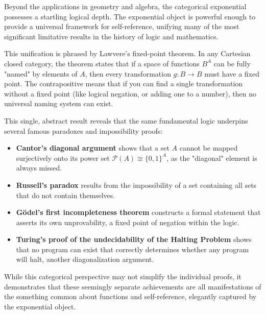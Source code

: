 \begin{tcolorbox}[
  colback=gray!5,
  colframe=gray!50,
  boxrule=0.5pt,
  arc=2pt,
  left=10pt,
  right=10pt,
  top=10pt,
  bottom=10pt,
  title={\centering\large\textbf{Lawvere's Fixed-Point Theorem and the Limits of Self-Reference}}
]

Beyond the applications in geometry and algebra, the categorical exponential possesses a startling logical depth. The exponential object is powerful enough to provide a universal framework for self-reference, unifying many of the most significant limitative results in the history of logic and mathematics.

This unification is phrased by Lawvere's fixed-point theorem. In any Cartesian closed category, the theorem states that if a space of functions $B^A$ can be fully "named" by elements of $A$, then every transformation $g: B \to B$ must have a fixed point. The contrapositive means that if you can find a single transformation without a fixed point (like logical negation, or adding one to a number), then no universal naming system can exist.

This single, abstract result reveals that the same fundamental logic underpins several famous paradoxes and impossibility proofs:

\begin{itemize}[leftmargin=*,itemsep=3pt]
\item \textbf{Cantor's diagonal argument} shows that a set $A$ cannot be mapped surjectively onto its power set $\mathcal{P}(A) \cong \{0, 1\}^A$, as the "diagonal" element is always missed.

\item \textbf{Russell's paradox} results from the impossibility of a set containing all sets that do not contain themselves.

\item \textbf{Gödel's first incompleteness theorem} constructs a formal statement that asserts its own unprovability, a fixed point of negation within the logic.

\item \textbf{Turing's proof of the undecidability of the Halting Problem} shows that no program can exist that correctly determines whether any program will halt, another diagonalization argument.
\end{itemize}

While this categorical perspective may not simplify the individual proofs, it demonstrates that these seemingly separate achievements are all manifestations of the something common about functions and self-reference, elegantly captured by the exponential object.

\end{tcolorbox}

